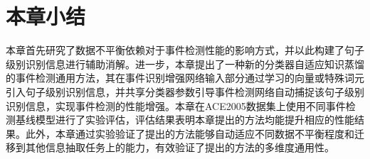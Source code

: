 \section{本章小结}
本章首先研究了数据不平衡依赖对于事件检测性能的影响方式，并以此构建了句子级别识别信息进行辅助消解。进一步，本章提出了一种新的分类器自适应知识蒸馏的事件检测通用方法，其在事件识别增强网络输入部分通过学习的向量或特殊词元引入句子级别识别信息，并共享分类器参数引导事件检测网络自动捕捉该句子级别识别信息，实现事件检测的性能增强。本章在ACE2005数据集上使用不同事件检测基线模型进行了实验评估，评估结果表明本章提出的方法均能提升相应的性能结果。此外，本章通过实验验证了提出的方法能够自动适应不同数据不平衡程度和迁移到其他信息抽取任务上的能力，有效验证了提出的方法的多维度通用性。